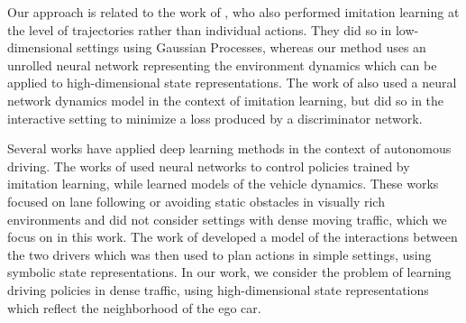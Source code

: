 \documentclass{article} %
\begin{document}
Our \modelnameil approach is related to the work of \citep{Englert2013}, who also performed imitation learning at the level of trajectories rather than individual actions. They did so in low-dimensional settings using Gaussian Processes, whereas our method uses an unrolled neural network representing the environment dynamics which can be applied to high-dimensional state representations. The work of \citep{Baram2017EndtoEndDA} also used a neural network dynamics model in the context of imitation learning, but did so in the interactive setting to minimize a loss produced by a discriminator network.


Several works have applied deep learning methods in the context of autonomous driving. The works of \citep{Pomerleau91, LeCun2006, Bojarski16, Pan17} used neural networks to control policies trained by imitation learning, while \citep{Williams2017} learned models of the vehicle dynamics. These works focused on lane following or avoiding static obstacles in visually rich environments and did not consider settings with dense moving traffic, which we focus on in this work. The work of \citep{Sadigh16} developed a model of the interactions between the two drivers which was then used to plan actions in simple settings, using symbolic state representations. In our work, we consider the problem of learning driving policies in dense traffic, using high-dimensional state representations which reflect the neighborhood of the ego car. %



\end{document}
